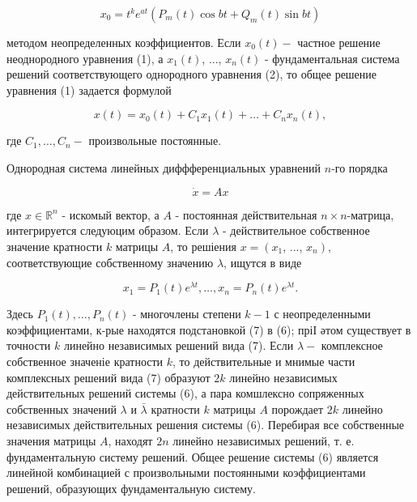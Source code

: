 \documentclass[10pt]{article}
\begin{document}
\[

x_{0}=t^{k} e^{a t}\left(P_{m}(t) \cos b t+Q_{m}(t) \sin b t\right)

\]



методом неопределенных коэффициентов. Если $x_{0}(t)-$ частное решение неоднородного уравнения (1), а $x_{1}(t)$, ..., $x_{n}(t)$ - фундаментальная система решений соответствующего однородного уравнения (2), то общее решение уравнения (1) задается формулой



\[

x(t)=x_{0}(t)+C_{1} x_{1}(t)+\ldots+C_{n} x_{n}(t),

\]



где $C_{1}, \ldots, C_{n}-$ произвольные постоянные.



Однородная система линейных диффференциальных уравнений $n$-го порядка



\[

\dot{x}=A x

\]



где $x \in \mathbb{R}^{n}$ - искомый вектор, а $A$ - постоянная действительная $n \times n$-матрица, интегрируется следуюцим образом. Если $\lambda$ - действительное собственное значение кратности $k$ матрицы $A$, то решіения $x=\left(x_{1}\right.$, ..., $\left.x_{n}\right)$, соответствующие собственному значению $\lambda$, ищутся в виде



\[

x_{1}=P_{1}(t) e^{\lambda t}, \ldots, x_{n}=P_{n}(t) e^{\lambda t} .

\]



Здесь $P_{1}(t), \ldots, P_{n}(t)$ - многочлены степени $k-1$ с неопределенными коэффициентами, к-рые находятся подстановкой (7) в (6); пріІ әтом существует в точности $k$ линейно независимых решений вида (7). Если $\lambda-$ комплексное собственное значеніе кратности $k$, то действительные и мнимые части комплексных решений вида (7) образуют $2 k$ линейно независимых действительных решений системы (6), а пара комшлексно сопряженных собственных значений $\lambda$ и $\bar{\lambda}$ кратности $k$ матрицы $A$ порождает $2 k$ линейно независимых действительных решения системы (6). Перебирая все собственные значения матрицы $A$, находят $2 n$ линейно независимых решений, т. е. фундаментальную систему решений. Общее решение системы (6) является линейной комбинацией с произвольными постоянными коэффициентами решений, образующих фундаментальную систему.
\end{document}
